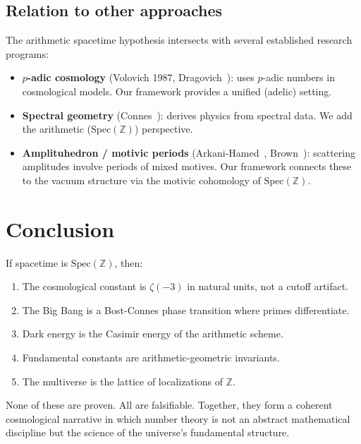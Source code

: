 \documentclass[11pt,a4paper]{article}
\newcommand{\Spec}{\mathrm{Spec}}
\begin{document}
\subsection{Relation to other approaches}

The arithmetic spacetime hypothesis intersects with several
established research programs:
\begin{itemize}
\item \textbf{$p$-adic cosmology} (Volovich 1987,
  Dragovich~\cite{Dragovich2017}): uses $p$-adic numbers in
  cosmological models. Our framework provides a unified
  (adelic) setting.
\item \textbf{Spectral geometry} (Connes~\cite{Connes1996}):
  derives physics from spectral data. We add the arithmetic
  ($\Spec(\mathbb{Z})$) perspective.
\item \textbf{Amplituhedron / motivic periods}
  (Arkani-Hamed~\cite{ArkaniHamed2014}, Brown~\cite{Brown2015}):
  scattering amplitudes involve periods of mixed motives.
  Our framework connects these to the vacuum structure
  via the motivic cohomology of $\Spec(\mathbb{Z})$.
\end{itemize}

\section{Conclusion}
\label{sec:conclusion}

If spacetime is $\Spec(\mathbb{Z})$, then:
\begin{enumerate}
\item The cosmological constant is $\zeta(-3)$ in natural units,
  not a cutoff artifact.
\item The Big Bang is a Bost-Connes phase transition where
  primes differentiate.
\item Dark energy is the Casimir energy of the arithmetic scheme.
\item Fundamental constants are arithmetic-geometric invariants.
\item The multiverse is the lattice of localizations of $\mathbb{Z}$.
\end{enumerate}

None of these are proven. All are falsifiable. Together, they
form a coherent cosmological narrative in which number theory
is not an abstract mathematical discipline but the science of
the universe's fundamental structure.
\end{document}
